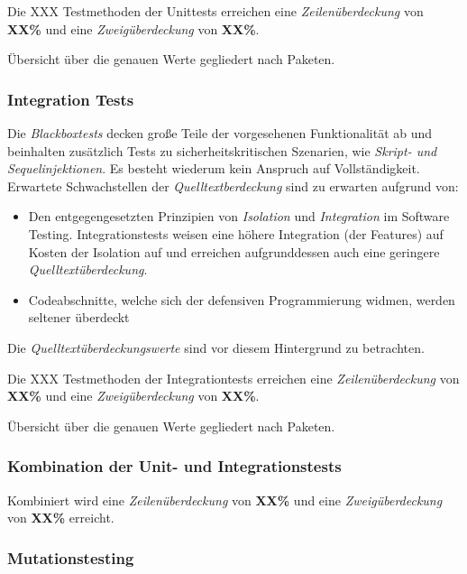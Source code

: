Die XXX Testmethoden der Unittests erreichen eine \emph{Zeilenüberdeckung} von \textbf{XX\%}
und eine \emph{Zweigüberdeckung} von \textbf{XX\%}.

Übersicht über die genauen Werte gegliedert nach Paketen.


\subsubsection{Integration Tests}
Die \emph{Blackboxtests} decken große Teile der vorgesehenen Funktionalität ab und beinhalten zusätzlich Tests
zu sicherheitskritischen Szenarien, wie \emph{Skript- und Sequelinjektionen}.
Es besteht wiederum kein Anspruch auf Vollständigkeit.
Erwartete Schwachstellen der \emph{Quelltextberdeckung} sind zu erwarten aufgrund von:
\begin{itemize}
    \item Den entgegengesetzten Prinzipien von \emph{Isolation} und \emph{Integration} im Software Testing.
    Integrationstests weisen eine höhere Integration (der Features) auf Kosten der Isolation auf und
    erreichen aufgrunddessen auch eine geringere \emph{Quelltextüberdeckung}.
    \item Codeabschnitte, welche sich der defensiven Programmierung widmen, werden seltener überdeckt
\end{itemize}
Die \emph{Quelltextüberdeckungswerte} sind vor diesem Hintergrund zu betrachten.

Die XXX Testmethoden der Integrationtests erreichen eine \emph{Zeilenüberdeckung} von \textbf{XX\%}
und eine \emph{Zweigüberdeckung} von \textbf{XX\%}.

Übersicht über die genauen Werte gegliedert nach Paketen.


\subsubsection{Kombination der Unit- und Integrationstests}

Kombiniert wird eine
\emph{Zeilenüberdeckung} von \textbf{XX\%} und eine \emph{Zweigüberdeckung} von \textbf{XX\%} erreicht.

\subsubsection{Mutationstesting}


